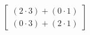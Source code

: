 \documentclass[preview]{standalone}
\begin{document}
\begin{align*}
\begin{bmatrix} (2 \cdot 3) + (0 \cdot 1) \\ (0 \cdot 3) + (2 \cdot 1) \end{bmatrix}
\end{align*}
\end{document}
